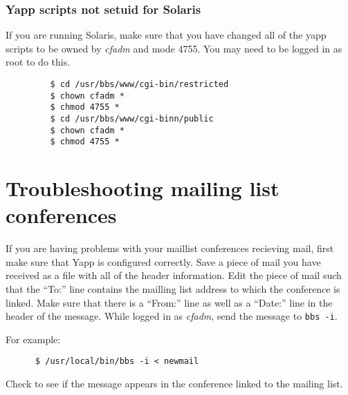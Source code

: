\documentclass[twoside]{report}
\begin{document}
         \subsubsection{Yapp scripts not setuid for Solaris}

           If you are running Solaris, make sure that you have
           changed all of the yapp scripts to be owned by 
           {\em cfadm} and mode 4755.  You may need to be
           logged in as root to do this.

         \begin{verbatim}
         $ cd /usr/bbs/www/cgi-bin/restricted
         $ chown cfadm *
         $ chmod 4755 *
         $ cd /usr/bbs/www/cgi-binn/public
         $ chown cfadm *
         $ chmod 4755 *
         \end{verbatim}




   \section{Troubleshooting mailing list conferences}\label{s:tmaillist}
      If you are having problems with your maillist conferences recieving mail,
      first make sure that Yapp is configured correctly.  Save a piece of mail 
      you have received as a file with all of the header information.  Edit 
      the piece of mail such that the ``To:'' line contains the mailling list 
      address to which the conference is linked.  Make sure that there is a 
      ``From:'' line as well as a ``Date:'' line in the header of the 
      message.  While logged in as {\em cfadm}, send the message to 
      {\tt bbs -i}.

      For example:
      \begin{verbatim}
      $ /usr/local/bin/bbs -i < newmail
      \end{verbatim}
      \vspace{-12pt}

      Check to see if the message appears in the conference linked to the 
      mailing list.
\end{document}
